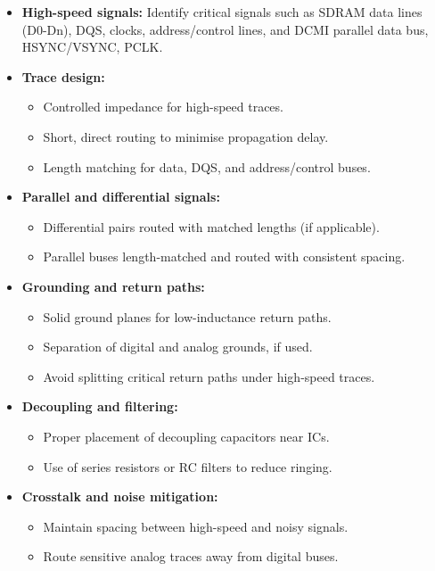 \documentclass[10pt]{article}
\begin{document}
\begin{itemize}
    \item \textbf{High-speed signals:} Identify critical signals such as SDRAM data lines (D0-Dn), DQS, clocks, address/control lines, and DCMI parallel data bus, HSYNC/VSYNC, PCLK.
    
    \item \textbf{Trace design:} 
        \begin{itemize}
            \item Controlled impedance for high-speed traces.
            \item Short, direct routing to minimise propagation delay.
            \item Length matching for data, DQS, and address/control buses.
        \end{itemize}
    
    \item \textbf{Parallel and differential signals:} 
        \begin{itemize}
            \item Differential pairs routed with matched lengths (if applicable).
            \item Parallel buses length-matched and routed with consistent spacing.
        \end{itemize}
    
    \item \textbf{Grounding and return paths:} 
        \begin{itemize}
            \item Solid ground planes for low-inductance return paths.
            \item Separation of digital and analog grounds, if used.
            \item Avoid splitting critical return paths under high-speed traces.
        \end{itemize}
    
    \item \textbf{Decoupling and filtering:} 
        \begin{itemize}
            \item Proper placement of decoupling capacitors near ICs.
            \item Use of series resistors or RC filters to reduce ringing.
        \end{itemize}
    
    \item \textbf{Crosstalk and noise mitigation:} 
        \begin{itemize}
            \item Maintain spacing between high-speed and noisy signals.
            \item Route sensitive analog traces away from digital buses.
        \end{itemize}
    

\end{itemize}
\end{document}
